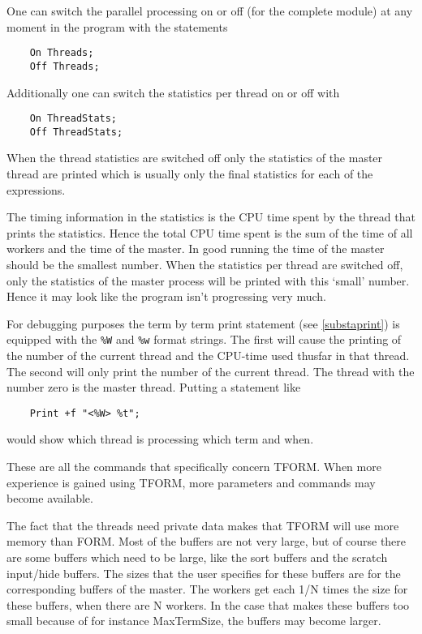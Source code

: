 One can switch the parallel processing on or off (for the complete module) 
at any moment in the program with the 
statements
\begin{verbatim}
    On Threads;
    Off Threads;
\end{verbatim}
Additionally one can switch the statistics per thread on or off with
\begin{verbatim}
    On ThreadStats;
    Off ThreadStats;
\end{verbatim}
When the thread statistics are 
switched off only the statistics of the master thread are printed which is 
usually only the final statistics for each of the expressions.

The timing information in the statistics is the CPU time 
spent by the thread that prints the statistics. Hence the total CPU time 
spent is the sum of the time of all workers and the time of the master. In 
good running the time of the master should be the smallest number. When the 
statistics per thread are switched off, only the statistics of the master 
process will be printed with this `small' number. Hence it may look like 
the program isn't progressing very much.

For debugging purposes the term by term print statement (see 
\ref{substaprint}) is equipped with the \verb:%W: and \verb:%w: format 
strings. The first will cause the printing of the number of the current 
thread and the CPU-time used thusfar in that thread. The second will only 
print the number of the current thread. The thread with the number zero is 
the master thread. Putting a statement like
\begin{verbatim}
    Print +f "<%W> %t";
\end{verbatim}
would show which thread is processing which term and when.

These are all the commands that specifically concern TFORM. When more 
experience is gained using TFORM, more parameters and commands may become 
available.

The fact that the threads need private data makes that TFORM 
will use more memory than FORM. Most of the buffers are not very large, but 
of course there are some buffers which need to be large, like the sort 
buffers and the scratch input/hide buffers. The 
sizes that the user specifies for these buffers are for the corresponding 
buffers of the master. The workers get each 1/N times the size for these 
buffers, when there are N workers. In the case that makes these buffers too 
small because of for instance MaxTermSize, the buffers may become larger.

